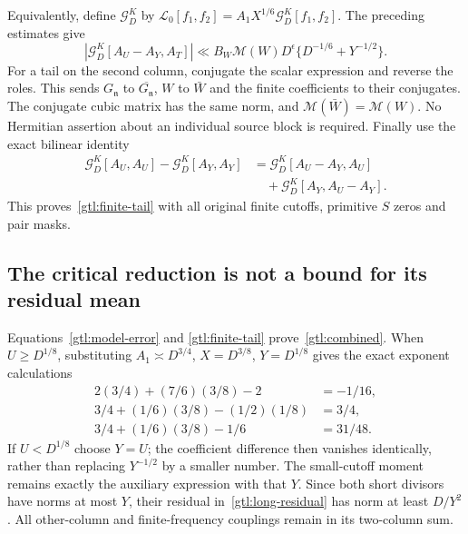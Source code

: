Equivalently, define $\mathcal G_D^K$ by
$\mathcal L_0[f_1,f_2]=A_1X^{1/6}\mathcal G_D^K[f_1,f_2]$.
The preceding estimates give
\begin{equation}\label{gtl:one-sided-moment}
 |\mathcal G_D^K[A_U-A_Y,A_T]|
 \ll B_W\mathcal M(W)D^\epsilon
                    \{D^{-1/6}+Y^{-1/2}\}.
\end{equation}
For a tail on the second column, conjugate the scalar
expression and reverse the roles. This sends $G_{\mathfrak n}$
to $\overline{G_{\mathfrak n}}$, $W$ to $\bar W$ and
the finite coefficients to their conjugates.
The conjugate cubic matrix has the same norm, and
$\mathcal M(\bar W)=\mathcal M(W)$.
No Hermitian assertion about an individual source block
is required. Finally use the exact bilinear identity
\begin{equation}\label{gtl:bilinear-difference}
 \begin{aligned}
 \mathcal G_D^K[A_U,A_U]-\mathcal G_D^K[A_Y,A_Y]
  &=\mathcal G_D^K[A_U-A_Y,A_U]\\
  &\quad+\mathcal G_D^K[A_Y,A_U-A_Y].
 \end{aligned}
\end{equation}
This proves~\eqref{gtl:finite-tail} with all original
finite cutoffs, primitive $S$ zeros and pair masks.

\subsection{The critical reduction is not a bound for its residual mean}
\label{gtl:critical-proof}
Equations~\eqref{gtl:model-error} and
\eqref{gtl:finite-tail} prove~\eqref{gtl:combined}.
When $U\ge D^{1/8}$, substituting
$A_1\asymp D^{3/4}$, $X=D^{3/8}$, $Y=D^{1/8}$
gives the exact exponent calculations
\begin{equation}\label{gtl:critical-powers}
 \begin{aligned}
 2(3/4)+(7/6)(3/8)-2&=-1/16,\\
 3/4+(1/6)(3/8)-(1/2)(1/8)&=3/4,\\
 3/4+(1/6)(3/8)-1/6&=31/48 .
 \end{aligned}
\end{equation}
If $U<D^{1/8}$ choose $Y=U$; the coefficient difference
then vanishes identically, rather than replacing
$Y^{-1/2}$ by a smaller number. The small-cutoff moment
remains exactly the auxiliary expression with that $Y$.
Since both short divisors have norms at most $Y$,
their residual in~\eqref{gtl:long-residual} has norm at
least $D/Y^2$. All other-column and finite-frequency
couplings remain in its two-column sum.

